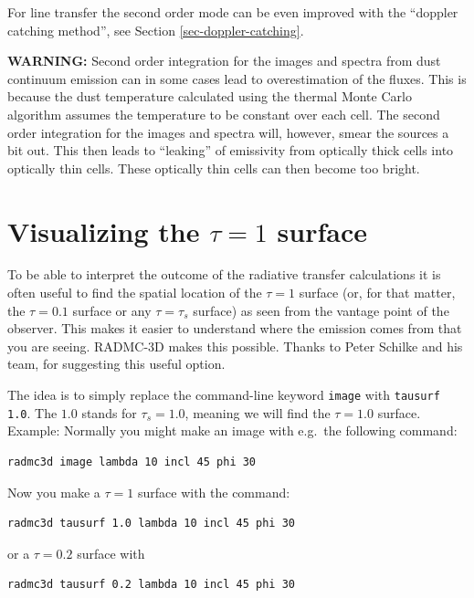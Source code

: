 \documentclass{report}
\newenvironment{asciibox}%
  {\begin{list}{}{%
    \setlength{\topsep}{0.5em}%
    \setlength{\parskip}{0em}%
    \setlength{\parsep}{0em}%
    \setlength{\itemsep}{0em}%
    \setlength{\rightmargin}{0em}%
    \setlength{\leftmargin}{3.0em}%
    \setlength{\labelsep}{1em}%
    \setlength{\labelwidth}{2em}%
  }\normalfont\footnotesize\item}
  {\end{list}}
\begin{document}
For line transfer the second order mode can be even improved with the
``doppler catching method'', see Section \ref{sec-doppler-catching}.

{\bf WARNING:} Second order integration for the images and spectra from dust
continuum emission can in some cases lead to overestimation of the fluxes.
This is because the dust temperature calculated using the thermal Monte
Carlo algorithm assumes the temperature to be constant over each cell. The
second order integration for the images and spectra will, however, smear the
sources a bit out. This then leads to ``leaking'' of emissivity from
optically thick cells into optically thin cells. These optically thin cells
can then become too bright.


\section{Visualizing the $\tau=1$ surface}
\label{sec-tausurf}
%
To be able to interpret the outcome of the radiative transfer calculations
it is often useful to find the spatial location of the $\tau=1$ surface (or,
for that matter, the $\tau=0.1$ surface or any $\tau=\tau_s$ surface) as
seen from the vantage point of the observer. This makes it easier to
understand where the emission comes from that you are seeing. RADMC-3D makes
this possible. Thanks to Peter Schilke and his team, for suggesting this
useful option.

The idea is to simply replace the command-line keyword {\small\tt image}
with  {\small\tt tausurf 1.0}. The $1.0$ stands for $\tau_s=1.0$, meaning
we will find the $\tau=1.0$ surface. Example: Normally you might make an
image with e.g.\ the following command:
\begin{asciibox}\begin{verbatim}
radmc3d image lambda 10 incl 45 phi 30
\end{verbatim}\end{asciibox}
Now you make a $\tau=1$ surface with the command:
\begin{asciibox}\begin{verbatim}
radmc3d tausurf 1.0 lambda 10 incl 45 phi 30
\end{verbatim}\end{asciibox}
or a $\tau=0.2$ surface with
\begin{asciibox}\begin{verbatim}
radmc3d tausurf 0.2 lambda 10 incl 45 phi 30
\end{verbatim}\end{asciibox}
\end{document}
